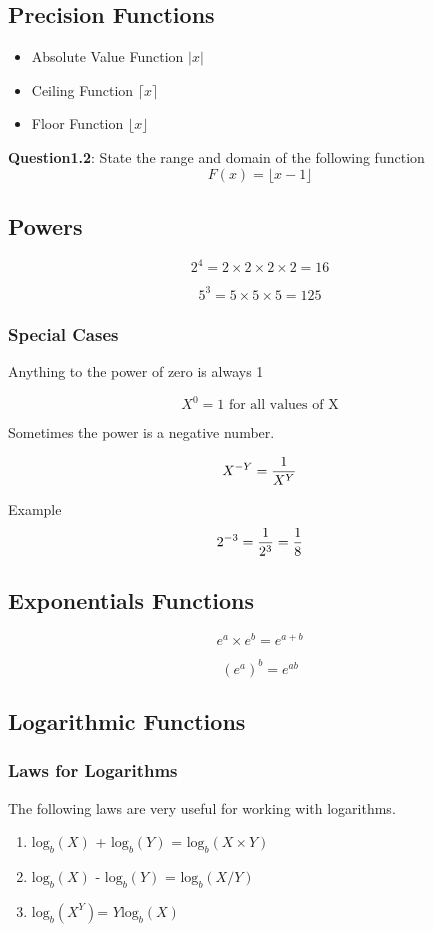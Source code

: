 \documentclass[12pt]{article} %
\begin{document}
\subsection{Precision Functions}

\begin{itemize}
\item Absolute Value Function $| x |$
\item Ceiling Function $\lceil x \rceil$
\item Floor Function  $\lfloor x \rfloor $
\end{itemize}

\noindent \textbf{Question1.2}: State the range and domain of the following function
\[ F(x) = \lfloor x-1 \rfloor \]
\subsection{Powers}

\[  2^ 4 = 2 \times 2 \times 2 \times 2 = 16 \]

\[  5^ 3 = 5 \times 5 \times 5 =125 \]

\subsubsection{Special Cases}

Anything to the power of zero is always 1

\[  X^ 0 = 1 \mbox{ for all values of X} \]

Sometimes the power is a negative number.

\[  X^{-Y} = { 1 \over X^Y}  \]

Example 
\[  2^{-3} = { 1 \over 2^3} = { 1 \over 8}  \]



\subsection{Exponentials Functions}

\[ e^a \times e^b = e^{a+b}\]

\[ (e^a )^b = e^{ab}\]
\subsection{Logarithmic Functions}

\subsubsection{Laws for Logarithms}
The following laws are very useful for working with logarithms.
\begin{enumerate}
\item $\mbox{log}_b(X)$ + $\mbox{log}_b(Y)$ = $\mbox{log}_b(X\times Y)$
\item $\mbox{log}_b(X)$ - $\mbox{log}_b(Y)$ = $\mbox{log}_b(X / Y)$
\item $\mbox{log}_b(X^Y)$= $Y \mbox{log}_b(X)$
\end{enumerate}
\end{document}
